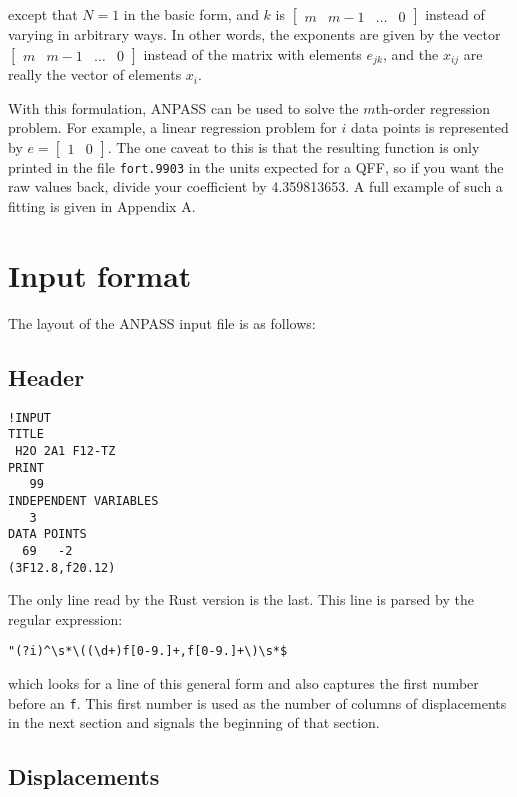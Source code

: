 \documentclass{article}
\begin{document}
\noindent
except that $N = 1$ in the basic form, and $k$ is
$\begin{bmatrix}m & m-1 & \dots & 0\end{bmatrix}$ instead of varying in
arbitrary ways. In other words, the exponents are given by the vector
$\begin{bmatrix}m & m-1 & \dots & 0\end{bmatrix}$ instead of the matrix with
elements $e_{jk}$, and the $x_{ij}$ are really the vector of elements $x_i$.

With this formulation, ANPASS can be used to solve the $m$th-order regression
problem. For example, a linear regression problem for $i$ data points is
represented by $e = \begin{bmatrix}1 & 0\end{bmatrix}$. The one caveat to this
is that the resulting function is only printed in the file \verb|fort.9903| in
the units expected for a QFF, so if you want the raw values back, divide your
coefficient by 4.359813653. A full example of such a fitting is given in
Appendix A.

\section{Input format}

The layout of the ANPASS input file is as follows:

\subsection{Header}

\begin{lstlisting}
!INPUT
TITLE
 H2O 2A1 F12-TZ
PRINT
   99
INDEPENDENT VARIABLES
   3
DATA POINTS
  69   -2
(3F12.8,f20.12)
\end{lstlisting}

\noindent
The only line read by the Rust version is the last. This line is parsed by the
regular expression:

\begin{lstlisting}
"(?i)^\s*\((\d+)f[0-9.]+,f[0-9.]+\)\s*$
\end{lstlisting}%

\noindent
which looks for a line of this general form and also captures the first number
before an \verb|f|. This first number is used as the number of columns of
displacements in the next section and signals the beginning of that section.

\subsection{Displacements}
\end{document}
